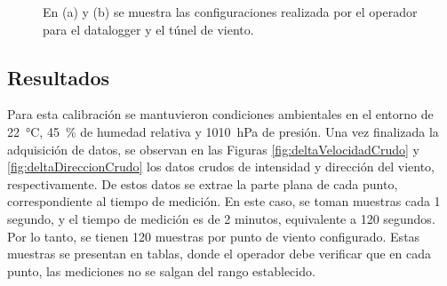 \begin{figure}[H]
\begin{minipage}[b]{0.18\textwidth}
    \end{minipage}  
    \hspace{1em} %
    \begin{minipage}[b]{0.23\textwidth}
        \centering
    \end{minipage}  
    \caption{En (a) y (b) se muestra las configuraciones realizada por el operador para el datalogger y el túnel de viento.}
    \label{fig:configEquiposDelta}
\end{figure} 


\subsection{Resultados}

Para esta calibración se mantuvieron condiciones ambientales en el entorno de \SI{22}{\degreeCelsius}, \SI{45}{\%} de humedad relativa y \SI{1010}{\hecto\pascal} de presión. Una vez finalizada la adquisición de datos, se observan en las Figuras \ref{fig:deltaVelocidadCrudo} y \ref{fig:deltaDireccionCrudo} los datos crudos de intensidad y dirección del viento, respectivamente. De estos datos se extrae la parte plana de cada punto, correspondiente al tiempo de medición. En este caso, se toman muestras cada 1 segundo, y el tiempo de medición es de 2 minutos, equivalente a 120 segundos. Por lo tanto, se tienen 120 muestras por punto de viento configurado. Estas muestras se presentan en tablas, donde el operador debe verificar que en cada punto, las mediciones no se salgan del rango establecido.

